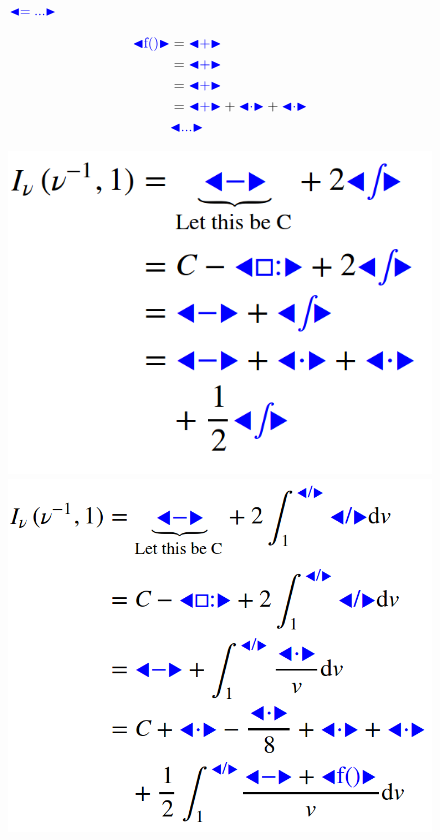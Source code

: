 \documentclass[conference]{IEEEtran}
\def\collapse#1{\textcolor{blue}{\ensuremath{\mathord{\blacktriangleleft}
\mathord{#1}
\mathord{\blacktriangleright}}}}
\begin{document}
\begin{figure}[t]
  \begin{minipage}{.08\textwidth}
    \centering
    $\collapse{=...}$
  \end{minipage}\qquad\qquad
  \begin{minipage}{.1\textwidth}
    \begin{align*}
      \collapse{\mathrm{f}()} & = \collapse{+} \\
                              & = \collapse{+} \\ 
                              & = \collapse{+} \\ 
                              & = \collapse{+} + \collapse{\cdot} + \collapse{\cdot} \\
                              & \collapse{...} 
    \end{align*}
  \end{minipage}
  \begin{minipage}{.25\textwidth}
    \centering
    \includegraphics[width=\textwidth]{expand1}
  \end{minipage}\qquad\quad
  \begin{minipage}{.25\textwidth}
    \centering
    \includegraphics[width=\textwidth]{expand2}

\end{minipage}
\end{figure}
\end{document}
